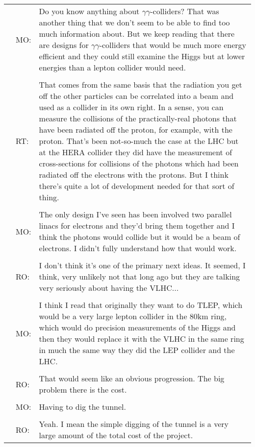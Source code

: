 \clearpage

\begin{table}[!ht]
\begin{tabular}{@{}p{0mm}p{5mm}p{120mm}@{}}
& MO: & Do you know anything about $\gamma\gamma$-colliders? That was another thing that we don't seem to be able to find too much information about. But we keep reading that there are designs for $\gamma\gamma$-colliders that would be much more energy efficient and they could still examine the Higgs but at lower energies than a lepton collider would need.\\\\

& RT: & That comes from the same basis that the radiation you get off the other particles can be correlated into a beam and used as a collider in its own right. In a sense, you can measure the collisions of the practically-real photons that have been radiated off the proton, for example, with the proton. That's been not-so-much the case at the LHC but at the HERA collider they did have the measurement of cross-sections for collisions of the photons which had been radiated off the electrons with the protons. But I think there's quite a lot of development needed for that sort of thing.\\\\

& MO: & The only design I've seen has been involved two parallel linacs for electrons and they'd bring them together and I think the photons would collide but it would be a beam of electrons. I didn't fully understand how that would work.\\\\

& RO: & I don't think it's one of the primary next ideas. It seemed, I think, very unlikely not that long ago but they are talking very seriously about having the VLHC...\\\\

& MO: & I think I read that originally they want to do TLEP, which would be a very large lepton collider in the 80km ring, which would do precision measurements of the Higgs and then they would replace it with the VLHC in the same ring in much the same way they did the LEP collider and the LHC.\\\\

& RO: & That would seem like an obvious progression. The big problem there is the cost.\\\\

& MO: & Having to dig the tunnel.\\\\

& RO: & Yeah. I mean the simple digging of the tunnel is a very large amount of the total cost of the project.
\end{tabular}
\end{table}

